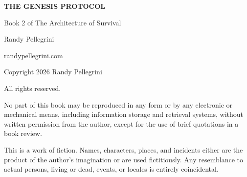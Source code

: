 \thispagestyle{empty}
\begin{titlepage}
\centering
\vspace*{1cm}
{\Huge\bfseries THE GENESIS PROTOCOL\par}
\vspace{0.8cm}
{\Large Book 2 of The Architecture of Survival\par}
\vspace{2.5cm}
{\LARGE Randy Pellegrini\par}
\vfill
{\normalsize randypellegrini.com\par}
\vspace{0.5cm}
{\small Copyright \textcopyright{} 2026 Randy Pellegrini\par}
\vspace{0.3cm}
{\small All rights reserved.\par}
\vspace{0.5cm}
{\footnotesize No part of this book may be reproduced in any form or by any electronic or mechanical means, including information storage and retrieval systems, without written permission from the author, except for the use of brief quotations in a book review.\par}
\vspace{0.3cm}
{\footnotesize This is a work of fiction. Names, characters, places, and incidents either are the product of the author's imagination or are used fictitiously. Any resemblance to actual persons, living or dead, events, or locales is entirely coincidental.\par}
\end{titlepage}
\clearpage
